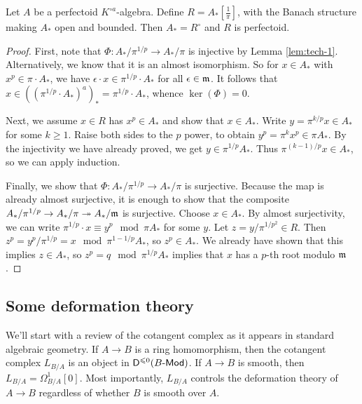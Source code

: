 \begin{proposition}
Let $A$ be a perfectoid $K^{\circ a}$-algebra. Define $R=A_\ast[\frac 1 \pi]$, with 
the Banach structure making $A_\ast$ open and bounded. Then $A_\ast = R^\circ$ 
and $R$ is perfectoid. 
\end{proposition}
\begin{proof}
First, note that $\Phi:A_\ast/\pi^{1/p} \to A_\ast/\pi$ is injective by Lemma 
\ref{lem:tech-1}. Alternatively, we know that it is an almost isomorphism. So 
for $x\in A_\ast$ with $x^p\in \pi\cdot A_\ast$, we have  
$\epsilon\cdot x\in \pi^{1/p}\cdot A_\ast$ for all $\epsilon\in\mathfrak{m}$. It follows 
that $x\in ((\pi^{1/p}\cdot A_\ast)^a)_\ast = \pi^{1/p}\cdot A_\ast$, whence 
$\ker(\Phi)=0$. 

Next, we assume $x\in R$ has $x^p\in A_\ast$ and show that $x\in A_\ast$. Write 
$y=\pi^{k/p} x\in A_\ast$ for some $k\geqslant 1$. Raise both sides to the $p$ 
power, to obtain $y^p=\pi^k x^p\in \pi A_\ast$. By the injectivity we have already 
proved, we get $y\in \pi^{1/p} A_\ast$. Thus 
$\pi^{(k-1)/p} x\in A_\ast$, so we can apply induction. 

Finally, we show that $\Phi:A_\ast/\pi^{1/p} \to A_\ast/\pi$ is surjective. Because 
the map is already almost surjective, it is enough to show that the composite 
$A_\ast/\pi^{1/p} \to A_\ast/\pi \twoheadrightarrow A_\ast/\mathfrak{m}$ is surjective. 
Choose $x\in A_\ast$. By almost surjectivity, we can write 
$\pi^{1/p}\cdot x \equiv y^p\mod \pi A_\ast$ for some $y$. Let $z=y/\pi^{1/p^2}\in R$. Then 
$z^p = y^p/\pi^{1/p} = x\mod \pi^{1-1/p} A_\ast$, so $z^p\in A_\ast$. We already 
have shown that this implies $z\in A_\ast$, so $z^p=q\mod \pi^{1/p} A_\ast$ implies 
that $x$ has a $p$-th root modulo $\mathfrak{m}$. 
\end{proof}





\subsection{Some deformation theory}

We'll start with a review of the cotangent complex as it appears in standard 
algebraic geometry. If $A\to B$ is a ring homomorphism, then the cotangent 
complex $L_{B/A}$ is an object in $\mathsf D^{\leqslant 0}(B\textnormal{-}\mathsf{Mod})$. If 
$A\to B$ is smooth, then $L_{B/A} = \Omega_{B/A}^1[0]$. Most importantly, 
$L_{B/A}$ controls the deformation theory of $A\to B$ regardless of whether $B$ 
is smooth over $A$. 

